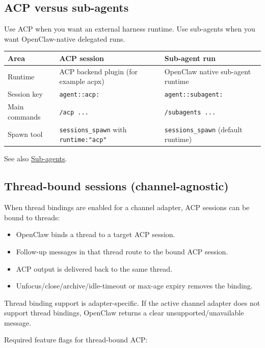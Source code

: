 \subsection{ACP versus sub-agents}


Use ACP when you want an external harness runtime. Use sub-agents when you want OpenClaw-native delegated runs.


\begin{table}[h]
\centering
\small
\begin{tabular}{|l|l|l|}
\hline
Area & ACP session & Sub-agent run \\
\hline
Runtime & ACP backend plugin (for example acpx) & OpenClaw native sub-agent runtime \\
\hline
Session key & \texttt{agent::acp:} & \texttt{agent::subagent:} \\
\hline
Main commands & \texttt{/acp ...} & \texttt{/subagents ...} \\
\hline
Spawn tool & \texttt{sessions\_spawn} with \texttt{runtime:"acp"} & \texttt{sessions\_spawn} (default runtime) \\
\hline
\end{tabular}
\end{table}



See also \href{/tools/subagents}{Sub-agents}.

\subsection{Thread-bound sessions (channel-agnostic)}


When thread bindings are enabled for a channel adapter, ACP sessions can be bound to threads:

\begin{itemize}
  \item OpenClaw binds a thread to a target ACP session.
  \item Follow-up messages in that thread route to the bound ACP session.
  \item ACP output is delivered back to the same thread.
  \item Unfocus/close/archive/idle-timeout or max-age expiry removes the binding.
\end{itemize}


Thread binding support is adapter-specific. If the active channel adapter does not support thread bindings, OpenClaw returns a clear unsupported/unavailable message.

Required feature flags for thread-bound ACP:

